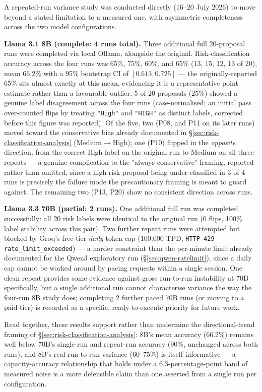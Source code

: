 A repeated-run variance study was conducted directly (16--20 July 2026) to move beyond a stated limitation to a measured one, with asymmetric completeness across the two model configurations.

\textbf{Llama 3.1 8B (complete: 4 runs total).} Three additional full 20-proposal runs were completed via local Ollama, alongside the original. Risk-classification accuracy across the four runs was 65\%, 75\%, 60\%, and 65\% (13, 15, 12, 13 of 20), mean 66.2\% with a 95\% bootstrap CI of $[0.613, 0.725]$ --- the originally-reported 65\% sits almost exactly at this mean, evidencing it is a representative point estimate rather than a favourable outlier. 5 of 20 proposals (25\%) showed a genuine label disagreement across the four runs (case-normalised; an initial pass over-counted flips by treating \texttt{"High"} and \texttt{"HIGH"} as distinct labels, corrected before this figure was reported). Of the five, two (P08, and P11 on its later runs) moved toward the conservative bias already documented in \S\ref{sec:risk-classification-analysis} (Medium$\rightarrow$High); one (P10) flipped in the \emph{opposite} direction, from the correct High label on the original run to Medium on all three repeats --- a genuine complication to the "always conservative" framing, reported rather than omitted, since a high-risk proposal being under-classified in 3 of 4 runs is precisely the failure mode the precautionary framing is meant to guard against. The remaining two (P13, P20) show no consistent direction across runs.

\textbf{Llama 3.3 70B (partial: 2 runs).} One additional full run was completed successfully: all 20 risk labels were identical to the original run (0 flips, 100\% label stability across this pair). Two further repeat runs were attempted but blocked by Groq's free-tier \emph{daily} token cap (100{,}000 TPD, \texttt{HTTP 429 rate\_limit\_exceeded}) --- a harder constraint than the per-minute limit already documented for the Qwen3 exploratory run (\S\ref{sec:qwen-ratelimit}), since a daily cap cannot be worked around by pacing requests within a single session. One clean repeat provides some evidence against gross run-to-run instability at 70B specifically, but a single additional run cannot characterise variance the way the four-run 8B study does; completing 2 further paced 70B runs (or moving to a paid tier) is recorded as a specific, ready-to-execute priority for future work.

Read together, these results support rather than undermine the directional-trend framing of \S\ref{sec:risk-classification-analysis}: 8B's mean accuracy (66.2\%) remains well below 70B's single-run and repeat-run accuracy (90\%, unchanged across both runs), and 8B's real run-to-run variance (60--75\%) is itself informative --- a capacity-accuracy relationship that holds under a 6.3-percentage-point band of measured noise is a more defensible claim than one asserted from a single run per configuration.

